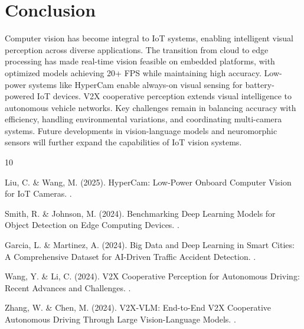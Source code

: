\documentclass[12pt,a4paper]{article}
\begin{document}
\section{Conclusion}

Computer vision has become integral to IoT systems, enabling intelligent visual perception across diverse applications. The transition from cloud to edge processing has made real-time vision feasible on embedded platforms, with optimized models achieving 20+ FPS while maintaining high accuracy. Low-power systems like HyperCam enable always-on visual sensing for battery-powered IoT devices. V2X cooperative perception extends visual intelligence to autonomous vehicle networks. Key challenges remain in balancing accuracy with efficiency, handling environmental variations, and coordinating multi-camera systems. Future developments in vision-language models and neuromorphic sensors will further expand the capabilities of IoT vision systems.


\begin{thebibliography}{10}

Liu, C. \& Wang, M. (2025).
\newblock HyperCam: Low-Power Onboard Computer Vision for IoT Cameras.
.

Smith, R. \& Johnson, M. (2024).
\newblock Benchmarking Deep Learning Models for Object Detection on Edge Computing Devices.
.

Garcia, L. \& Martinez, A. (2024).
\newblock Big Data and Deep Learning in Smart Cities: A Comprehensive Dataset for AI-Driven Traffic Accident Detection.
.

Wang, Y. \& Li, C. (2024).
\newblock V2X Cooperative Perception for Autonomous Driving: Recent Advances and Challenges.
.

Zhang, W. \& Chen, M. (2024).
\newblock V2X-VLM: End-to-End V2X Cooperative Autonomous Driving Through Large Vision-Language Models.
.

\end{thebibliography}
\end{document}
